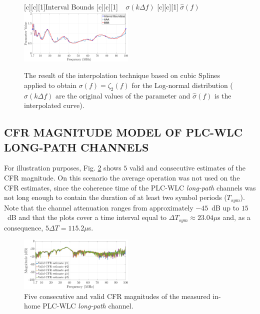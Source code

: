 \documentclass[journal]{IEEEtran}
\begin{document}
\begin{figure}[h]
	\centering
	[c][1]{Interval Bounds}
	[c][1]{${~~~~~\sigma}(k \Delta f)$}
	[c][1]{$~\hat{\sigma}(f)$}
	\includegraphics[width=0.49\textwidth]{images/Beta_fitsW.eps}
	\caption{The result of the interpolation technique based on cubic Splines applied to obtain $\sigma(f)=\zeta_2(f)$ for the Log-normal distribution (${\sigma}(k \Delta f)$ are the original values of the parameter and $\hat{\sigma}(f)$ is the interpolated curve).}
	\label{Fit_betasW}
\end{figure}

\subsection{CFR MAGNITUDE MODEL OF PLC-WLC LONG-PATH CHANNELS}\label{sec:MMHYBL}

For illustration purposes, Fig. \ref{respfreqlW} shows $5$ valid and consecutive estimates of the \ac{CFR} magnitude. On this scenario the average operation was not used on the \ac{CFR} estimates, since the coherence time of the \ac{PLC}-\ac{WLC} \textit{long-path} channels was not long enough to contain the duration of at least two symbol periods ($T_{sym}$). Note that the channel attenuation ranges from approximately $-45$~dB up to $15$~dB and that the plots cover a time interval equal to $\Delta T_{sym}\approx23.04\mu$s and, as a consequence, $5\Delta T = 115.2\mu$s.

\begin{figure}[h]
	\centering
	\includegraphics[width=0.49\textwidth]{images/respfreqlW.eps}
	\caption{Five consecutive and valid CFR magnitudes of the measured in-home PLC-WLC \textit{long-path} channel.}
	\label{respfreqlW}
\end{figure}
\end{document}
